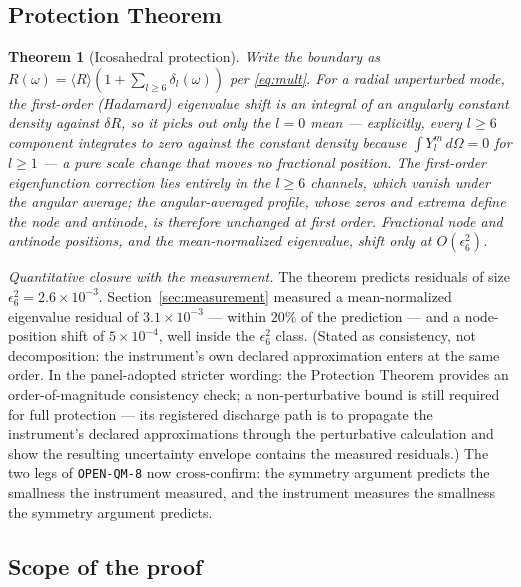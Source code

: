 \documentclass[12pt]{article}
\newtheorem{theorem}{Theorem}
\begin{document}
\subsection{Protection Theorem}
\label{sec:protection}

\begin{theorem}[Icosahedral protection]
Write the boundary as $R(\omega) = \langle R\rangle(1 +
\sum_{l\ge6}\delta_l(\omega))$ per \eqref{eq:mult}.  For a radial
unperturbed mode, the first-order (Hadamard) eigenvalue shift is an
integral of an angularly \emph{constant} density against $\delta R$,
so it picks out only the $l = 0$ mean --- explicitly, every $l \ge 6$
component integrates to zero against the constant density because
$\int Y_l^m\, d\Omega = 0$ for $l \ge 1$ --- a pure scale change that
moves no fractional position.  The first-order eigenfunction
correction lies entirely in the $l \ge 6$ channels, which vanish under
the angular average; the angular-averaged profile, whose zeros and
extrema define the node and antinode, is therefore unchanged at first
order.  Fractional node and antinode positions, and the
mean-normalized eigenvalue, shift only at $O(\epsilon_6^2)$.
\end{theorem}

\noindent\emph{Quantitative closure with the measurement.}  The
theorem predicts residuals of size $\epsilon_6^2 = 2.6\times10^{-3}$.
Section~\ref{sec:measurement} measured a mean-normalized eigenvalue
residual of $3.1\times10^{-3}$ --- within $20\%$ of the prediction ---
and a node-position shift of $5\times10^{-4}$, well inside the
$\epsilon_6^2$ class.  (Stated as consistency, not decomposition: the
instrument's own declared approximation enters at the same order.  In
the panel-adopted stricter wording: the Protection Theorem provides an
order-of-magnitude consistency check; a non-perturbative bound is
still required for full protection --- its registered discharge path is
to propagate the instrument's declared approximations through the
perturbative calculation and show the resulting uncertainty envelope
contains the measured residuals.)
The two legs of \texttt{OPEN-QM-8} now cross-confirm: the symmetry
argument predicts the smallness the instrument measured, and the
instrument measures the smallness the symmetry argument predicts.

\subsection{Scope of the proof}
\end{document}
